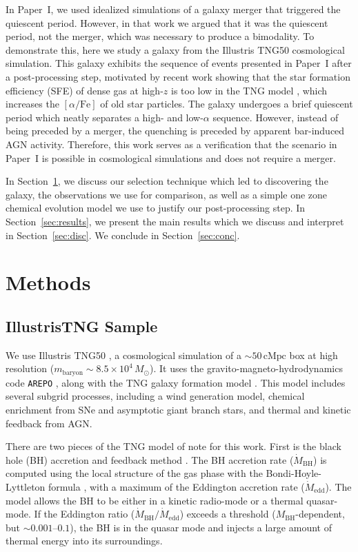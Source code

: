 \documentclass[twocolumn]{aastex631}
\newcommand{\Msun}{\ensuremath{M_{\odot}}}
\newcommand{\alphaFe}{\ensuremath{[\alpha/\textrm{Fe}]}}
\begin{document}
In Paper~I, we used idealized simulations of a galaxy merger that triggered the quiescent period. However, in that work we argued that it was the quiescent period, not the merger, which was necessary to produce a bimodality. To demonstrate this, here we study a galaxy from the Illustris TNG50 cosmological simulation. This galaxy exhibits the sequence of events presented in Paper~I after a post-processing step, motivated by recent work showing that the star formation efficiency (SFE) of dense gas at high-$z$ is too low in the TNG model \citep{2024arXiv240909121H}, which increases the \alphaFe{} of old star particles. The galaxy undergoes a brief quiescent period which neatly separates a high- and low-$\alpha$ sequence. However, instead of being preceded by a merger, the quenching is preceded by apparent bar-induced AGN activity. Therefore, this work serves as a verification that the scenario in Paper~I is possible in cosmological simulations and does not require a merger.

In Section~\ref{sec:methods}, we discuss our selection technique which led to discovering the galaxy, the observations we use for comparison, as well as a simple one zone chemical evolution model we use to justify our post-processing step. In Section~\ref{sec:results}, we present the main results which we discuss and interpret in Section~\ref{sec:disc}. We conclude in Section~\ref{sec:conc}.

\section{Methods}\label{sec:methods}
\subsection{IllustrisTNG Sample}\label{ssec:tng}
We use Illustris TNG50 \citep{2019MNRAS.490.3196P, 2019MNRAS.490.3234N, 2019ComAC...6....2N}, a cosmological simulation of a $\sim50\,\textrm{cMpc}$ box at high resolution ($m_{\textrm{baryon}}\sim8.5\times10^4\,\Msun$). It uses the gravito-magneto-hydrodynamics code \texttt{AREPO} \citep{2010MNRAS.401..791S, 2016MNRAS.455.1134P}, along with the TNG galaxy formation model \citep{2013MNRAS.436.3031V, 2017MNRAS.465.3291W, 2018MNRAS.473.4077P}. This model includes several subgrid processes, including a wind generation model, chemical enrichment from SNe and asymptotic giant branch stars, and thermal and kinetic feedback from AGN.

There are two pieces of the TNG model of note for this work. First is the black hole (BH) accretion and feedback method \citep{2017MNRAS.465.3291W}. The BH accretion rate ($\dot{M}_{\textrm{BH}}$) is computed using the local structure of the gas phase with the Bondi-Hoyle-Lyttleton formula \citep{1939PCPS...35..405H,1944MNRAS.104..273B,1952MNRAS.112..195B}, with a maximum of the Eddington accretion rate ($\dot{M}_{\textrm{edd}}$). The model allows the BH to be either in a kinetic radio-mode or a thermal quasar-mode. If the Eddington ratio ($\dot{M}_{\textrm{BH}}/\dot{M}_{\textrm{edd}}$) exceeds a threshold ($M_{\textrm{BH}}$-dependent, but $\sim0.001$--$0.1$), the BH is in the quasar mode and injects a large amount of thermal energy into its surroundings.
\end{document}

